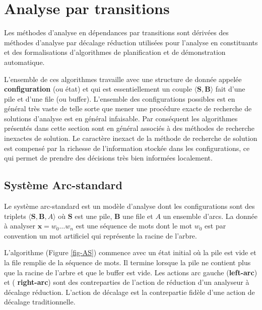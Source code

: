 \documentclass[11pt,openany]{book}
\begin{document}
\section{Analyse par transitions}

Les méthodes d'analyse en dépendances par transitions sont dérivées
des méthodes d'analyse par décalage réduction utilisées pour l'analyse
en constituants et des formalisations d'algorithmes de planification
et de démonstration automatique.

L'ensemble de ces algorithmes travaille avec une structure de donnée
appelée {\bf configuration} (ou état) et qui est essentiellement un couple $\langle
\mathbf{S} , \mathbf{B}\rangle$ fait d'une pile et d'une file (ou
buffer). L'ensemble des configurations possibles est en général très
vaste de telle sorte que mener une procédure exacte de recherche de
solutions d'analyse est en général infaisable. Par conséquent les
algorithmes présentés dans cette section sont en général associés à
des méthodes de recherche inexactes de solution. Le caractère inexact
de la méthode de recherche de solution est compensé par la richesse de
l'information stockée dans les configurations, ce qui permet de
prendre des décisions très bien informées localement.

\subsection{Système Arc-standard}

Le système arc-standard est un modèle d'analyse dont les configurations
sont des triplets $\langle \mathbf{S},\mathbf{B} ,  A\rangle$ où
$\mathbf{S}$ est une pile, $\mathbf{B}$ une file et $A$ un ensemble d'arcs.
La donnée à analyser $\mathbf{x} = w_0\ldots w_n$ est une séquence de mots
dont le mot $w_0$ est par convention un mot artificiel qui représente
la racine de l'arbre.

L'algorithme (Figure \ref{fig-AS}) commence avec un état initial où la
pile est vide et la file remplie de la séquence de mots. Il termine
lorsque la pile ne contient plus que la racine de l'arbre et que le
buffer est vide. Les actions arc gauche ({\bf left-arc}) et ({\bf
  right-arc}) sont des contreparties de l'action de réduction d'un
analyseur à décalage réduction. L'action de décalage est la
contrepartie fidèle d'une action de décalage traditionnelle.
\end{document}
